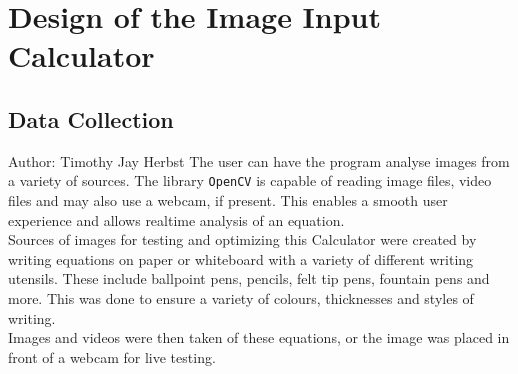 \documentclass[11pt]{article}
\begin{document}
	\section{Design of the Image Input Calculator}
	
	\subsection{Data Collection}
	\small{Author: Timothy Jay Herbst} \newline \newline
	The user can have the program analyse images from a variety of sources.
	The library \texttt{OpenCV} is capable of reading image files, video files and may also use a webcam, if present.
	This enables a smooth user experience and allows realtime analysis of an equation.\\
	Sources of images for testing and optimizing this Calculator were created by writing equations on paper or whiteboard with a variety of different writing utensils.
	These include ballpoint pens, pencils, felt tip pens, fountain pens and more.
	This was done to ensure a variety of colours, thicknesses and styles of writing.\\
	Images and videos were then taken of these equations, or the image was placed in front of a webcam for live testing.
	
	
\end{document}
